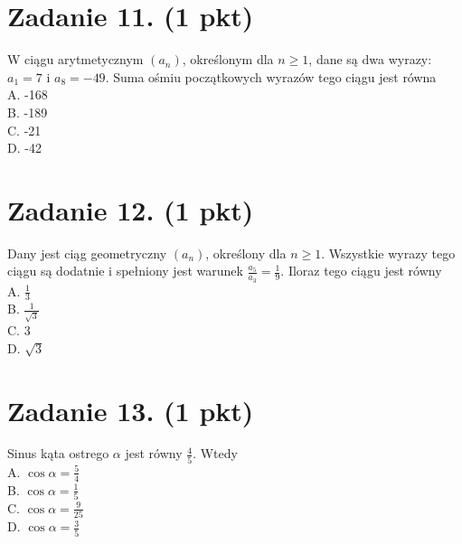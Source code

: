 \documentclass[10pt]{article}
\begin{document}
\section*{Zadanie 11. (1 pkt)}
W ciągu arytmetycznym \(\left(a_{n}\right)\), określonym dla \(n \geq 1\), dane są dwa wyrazy: \(a_{1}=7\) i \(a_{8}=-49\). Suma ośmiu początkowych wyrazów tego ciągu jest równa\\
A. -168\\
B. -189\\
C. -21\\
D. -42

\section*{Zadanie 12. (1 pkt)}
Dany jest ciąg geometryczny \(\left(a_{n}\right)\), określony dla \(n \geq 1\). Wszystkie wyrazy tego ciągu są dodatnie i spełniony jest warunek \(\frac{a_{5}}{a_{3}}=\frac{1}{9}\). Iloraz tego ciągu jest równy\\
A. \(\frac{1}{3}\)\\
B. \(\frac{1}{\sqrt{3}}\)\\
C. 3\\
D. \(\sqrt{3}\)

\section*{Zadanie 13. (1 pkt)}
Sinus kąta ostrego \(\alpha\) jest równy \(\frac{4}{5}\). Wtedy\\
A. \(\cos \alpha=\frac{5}{4}\)\\
B. \(\cos \alpha=\frac{1}{5}\)\\
C. \(\cos \alpha=\frac{9}{25}\)\\
D. \(\cos \alpha=\frac{3}{5}\)
\end{document}
